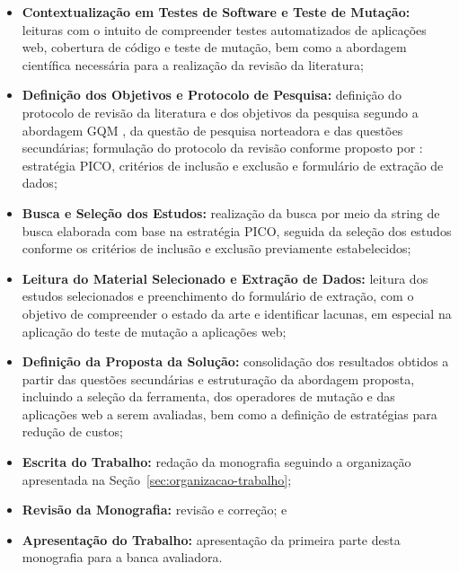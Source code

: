 \begin{itemize}[
    noitemsep,
    topsep=3pt,
    parsep=0pt,
    partopsep=0pt,
    leftmargin=1.25cm
]
    \item \textbf{Contextualização em Testes de Software e Teste de Mutação:} leituras com o intuito de compreender testes automatizados de aplicações web, cobertura de código e teste de mutação, bem como a abordagem científica necessária para a realização da revisão da literatura;

    \item \textbf{Definição dos Objetivos e Protocolo de Pesquisa:} definição do protocolo de revisão da literatura e dos objetivos da pesquisa segundo a abordagem GQM \cite{basili1994}, da questão de pesquisa norteadora e das questões secundárias; formulação do protocolo da revisão conforme proposto por : estratégia PICO, critérios de inclusão e exclusão e formulário de extração de dados;

    \item \textbf{Busca e Seleção dos Estudos:} realização da busca por meio da string de busca elaborada com base na estratégia PICO, seguida da seleção dos estudos conforme os critérios de inclusão e exclusão previamente estabelecidos;

    \item \textbf{Leitura do Material Selecionado e Extração de Dados:} leitura dos estudos selecionados e preenchimento do formulário de extração, com o objetivo de compreender o estado da arte e identificar lacunas, em especial na aplicação do teste de mutação a aplicações web;

    \item \textbf{Definição da Proposta da Solução:} consolidação dos resultados obtidos a partir das questões secundárias e estruturação da abordagem proposta, incluindo a seleção da ferramenta, dos operadores de mutação e das aplicações web a serem avaliadas, bem como a definição de estratégias para redução de custos;

    \item \textbf{Escrita do Trabalho:} redação da monografia seguindo a organização apresentada na Seção~\ref{sec:organizacao-trabalho};

    \item \textbf{Revisão da Monografia:} revisão e correção; e

    \item \textbf{Apresentação do Trabalho:} apresentação da primeira parte desta monografia para a banca avaliadora.
\end{itemize}

